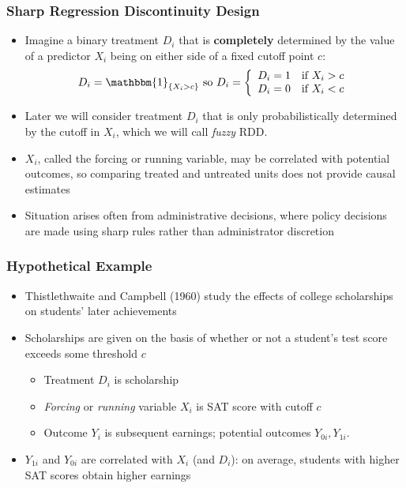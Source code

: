 \documentclass[xcolor=dvipsnames]{beamer}
\begin{document}
\begin{frame}
  \frametitle{Sharp Regression Discontinuity Design}
\begin{itemize}
\small
\item<1-> Imagine a binary treatment $D_i$ that is \textbf{completely} determined by the value of a predictor $X_i$ being on either side of a fixed cutoff point $c$:
\[
D_i=\mathbbm{1}_{\{X_i>c\}} \,\, \mbox{so}\,\, D_i = \left\{
 \begin{array}{ll}
  D_{i}=1 & \mbox{if $X_i>c$}\\
  D_{i}=0 & \mbox{if $X_i<c$}
 \end{array}
 \right.
\]\medskip

\item<2-> Later we will consider treatment $D_i$ that is only probabilistically determined by the cutoff in $X_i$, which we will call \textit{fuzzy} RDD. \bigskip
\item<3-> $X_i$, called the forcing or running variable, may be correlated with potential outcomes, so comparing treated and untreated units does not provide causal estimates \bigskip
\item<4-> Situation arises often from administrative decisions, where policy decisions are made using sharp rules rather than administrator discretion
\end{itemize}
\end{frame}

\begin{frame}
  \frametitle{Hypothetical Example}
  \begin{itemize}
  \item<1->  Thistlethwaite and Campbell (1960) study the effects of college
 scholarships on students' later achievements \bigskip
 \item<2-> Scholarships are given on the basis of whether or not a
 student's test score exceeds some threshold $c$
\begin{itemize}
\item<3-> Treatment $D_i$ is scholarship\smallskip
\item<4-> \textit{Forcing} or \textit{running} variable  $X_i$ is SAT score with cutoff $c$ \smallskip
\item<5-> Outcome $Y_i$ is subsequent earnings; potential outcomes $Y_{0i}, Y_{1i}$. 
\end{itemize}
\item<6-> $Y_{1i}$ and $Y_{0i}$ are correlated with $X_i$ (and $D_i$): on average, students
with higher SAT scores obtain higher earnings
\end{itemize}
\end{frame}
\end{document}

